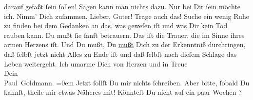 \begin{ledgroupsized}[t]{13cm}
               darauf gefaßt ſein ſollen! Sagen kann man nichts dazu. Nur bei Dir ſein möchte ich.
               Nimm’ Dich zuſammen, Lieber, Guter! Trage auch das! Suche ein wenig Ruhe zu finden
               bei dem Gedanken an das, was geweſen iſt und was Dir kein Tod rauben kann. {\pb}Du mußt ſie ſanft betrauern. Das iſt die Trauer, die im Sinne ihres
               armen Herzens iſt. Und Du mußt, Du \uline{mußt} Dich zu der
               Erkenntniß durchringen, daß ſelbſt jetzt nicht Alles zu Ende iſt und daß ſelbſt nach
               dieſem Schlage das Leben weitergeht.\pend
           \pstart
           Ich umarme Dich von Herzen und in Treue {\\[\baselineskip]}Dein {\\[\baselineskip]}\spacefill\mbox{Paul Goldmann.}\pend
           \leftskip=0em{}\pstart
           \noindent{}Jetzt ſollſt Du mir nichts ſchreiben. Aber bitte, ſobald Du kannſt, theile mir
                  etwas Näheres mit!\pend
           \pstart
           Könnteſt Du nicht auf ein paar Wochen \label{K_L02870-3v}\label{K_L02870-3h}?\pend
           
         
         \endnumbering{}\end{ledgroupsized}  \newcommand{\dateiname}{L02870}\newcommand{\titel}{Paul Goldmann an Arthur Schnitzler, 20. 3. [1899]}\newcommand{\editorInnen}{Martin Anton Müller und Laura Untner}
      